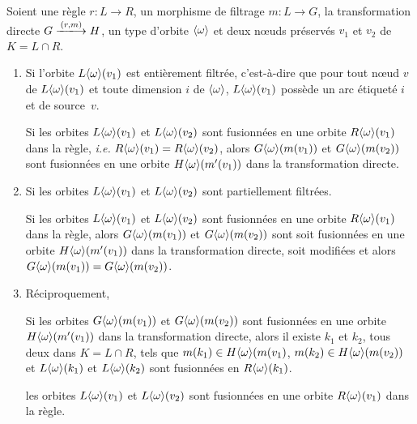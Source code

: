 \begin{proposition}
	\label{prop:base-rule-merge}
	Soient une règle $r : L \longrightarrow R$, un morphisme de filtrage $m : L \rightarrow G$, la transformation directe $G \xlongrightarrow{(r,m)} H$, un type d'orbite $\langle\omega\rangle$ et deux n\oe uds préservés $v_1$ et $v_2$ de $K = L \cap R$.

	\begin{enumerate}
		\item Si l'orbite $L\langle\omega\rangle(v_1)$ est entièrement
		      filtrée, c'est-à-dire que pour tout n\oe ud $v$ de $L\langle\omega\rangle(v_1)$ et toute dimension $i$ de $\langle\omega\rangle$,
		      $L\langle\omega\rangle(v_1)$ possède un arc étiqueté  $i$ et de source~$v$.

		      Si les orbites $L\langle\omega\rangle(v_1)$ et $L\langle\omega\rangle(v_2)$ sont fusionnées en une orbite $R\langle\omega\rangle(v_1)$ dans la règle, \textit{i.e.} $R\langle\omega\rangle(v_1) = R\langle\omega\rangle(v_2)$,
		      alors $G\langle\omega\rangle(m(v_1))$ et $G\langle\omega\rangle(m(v_2))$ sont fusionnées en une orbite $H\langle\omega\rangle(m'(v_1))$ dans la
		      transformation directe.

		\item Si les orbites $L\langle\omega\rangle(v_1)$ et $L\langle\omega\rangle(v_2)$ sont partiellement filtrées.

		      Si les orbites $L\langle\omega\rangle(v_1)$ et $L\langle\omega\rangle(v_2)$ sont fusionnées en une orbite $R\langle\omega\rangle(v_1)$ dans la règle,
		      alors $G\langle\omega\rangle(m(v_1))$ et $G\langle\omega\rangle(m(v_2))$ sont soit fusionnées en une orbite $H\langle\omega\rangle(m'(v_1))$ dans
		      la transformation directe, soit modifiées et alors $G\langle\omega\rangle(m(v_1)) = G\langle\omega\rangle(m(v_2))$.



		\item Réciproquement,

		      Si les orbites $G\langle\omega\rangle(m(v_1))$ et $G\langle\omega\rangle(m(v_2))$ sont fusionnées en une orbite $H\langle\omega\rangle(m'(v_1))$ dans
		      la transformation directe, alors il existe $k_1$ et $k_2$, tous deux dans $K = L \cap R$, tels que  $m(k_1) \in H\langle\omega\rangle(m(v_1)$, $m(k_2) \in H\langle\omega\rangle(m(v_2))$
		      et $L\langle\omega\rangle(k_1)$ et $L\langle\omega\rangle(k_2)$ sont fusionnées en $R\langle\omega\rangle(k_1)$.

		      les orbites $L\langle\omega\rangle(v_1)$ et $L\langle\omega\rangle(v_2)$ sont fusionnées en une orbite
		      $R\langle\omega\rangle(v_1)$ dans la règle.
	\end{enumerate}
\end{proposition}

